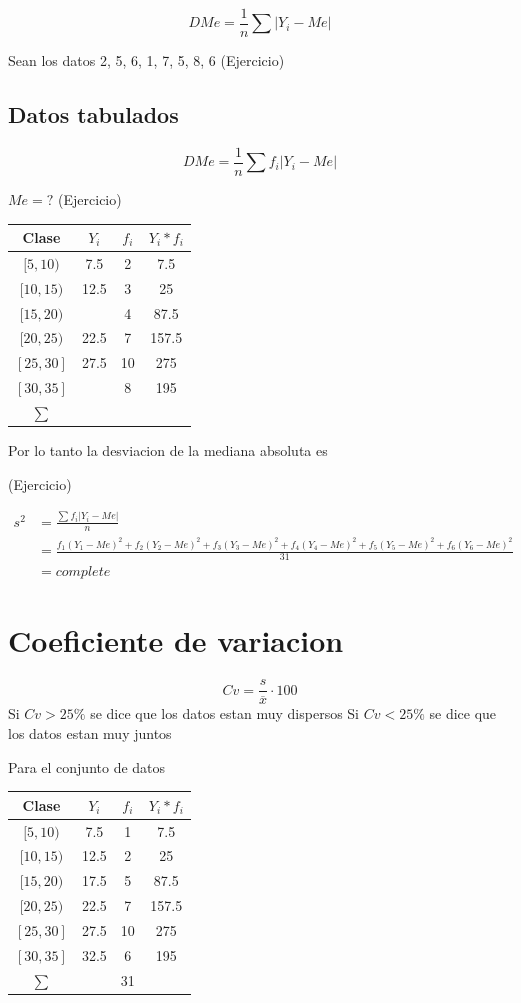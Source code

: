 \documentclass[
  11pt,
]{krantz}
\theoremstyle{definition}
\theoremstyle{definition}
\theoremstyle{definition}
\theoremstyle{definition}
\theoremstyle{remark}
\begin{document}
\[DMe=\frac{1}{n}\sum \left\vert Y_i-Me\right\vert\]

Sean los datos 2, 5, 6, 1, 7, 5, 8, 6 (Ejercicio)

\hypertarget{datos-tabulados-2}{%
\subsection{Datos tabulados}\label{datos-tabulados-2}}

\[DMe=\frac{1}{n}\sum f_i \left \vert Y_i-Me\right\vert\]

\(Me=?\) (Ejercicio)

\begin{longtable}[]{@{}cccc@{}}
\toprule
Clase & \(Y_i\) & \(f_i\) & \(Y_i*f_i\) \\
\midrule
\endhead
\([5,10)\) & 7.5 & 2 & 7.5 \\
\([10,15)\) & 12.5 & 3 & 25 \\
\([15,20)\) & & 4 & 87.5 \\
\([20,25)\) & 22.5 & 7 & 157.5 \\
\([25,30]\) & 27.5 & 10 & 275 \\
\([30,35]\) & & 8 & 195 \\
\(\sum\) & & & \\
\bottomrule
\end{longtable}

Por lo tanto la desviacion de la mediana absoluta es

(Ejercicio)

\[
\begin{aligned}
s^2&=\frac{\sum f_i\left \vert Y_i-Me\right \vert}{n}\\
&=\frac{f_1\left(Y_1-Me\right )^2+f_2\left(Y_2-Me\right )^2+f_3\left(Y_3-Me\right )^2+f_4\left(Y_4-Me\right )^2+f_5\left(Y_5-Me\right )^2+f_6\left(Y_6-Me\right )^2}{31}\\
&=complete
\end{aligned}
\]

\hypertarget{coeficiente-de-variacion}{%
\section{Coeficiente de variacion}\label{coeficiente-de-variacion}}

\[Cv=\frac{s}{\overline{x}}\cdot 100\] Si \(Cv>25\%\) se dice que los datos estan muy dispersos Si \(Cv<25\%\) se dice que los datos estan muy juntos

Para el conjunto de datos

\begin{longtable}[]{@{}cccc@{}}
\toprule
Clase & \(Y_i\) & \(f_i\) & \(Y_i*f_i\) \\
\midrule
\endhead
\([5,10)\) & 7.5 & 1 & 7.5 \\
\([10,15)\) & 12.5 & 2 & 25 \\
\([15,20)\) & 17.5 & 5 & 87.5 \\
\([20,25)\) & 22.5 & 7 & 157.5 \\
\([25,30]\) & 27.5 & 10 & 275 \\
\([30,35]\) & 32.5 & 6 & 195 \\
\(\sum\) & & 31 & \\
\bottomrule
\end{longtable}
\end{document}

